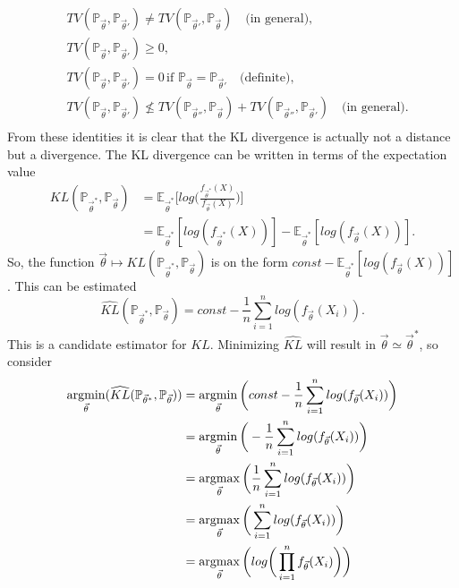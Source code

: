 \begin{equation}
	\begin{split}
		&TV(\mathbb{P}_{\vec{\theta}},\mathbb{P}_{\vec{\theta}'})\neq TV(\mathbb{P}_{\vec{\theta}'},\mathbb{P}_{\vec{\theta}})\quad \text{(in general)},\\
		&TV(\mathbb{P}_{\vec{\theta}},\mathbb{P}_{\vec{\theta}'})\geq 0,\\
		&TV(\mathbb{P}_{\vec{\theta}},\mathbb{P}_{\vec{\theta}'})=0\,\text{if } \mathbb{P}_{\vec{\theta}}=\mathbb{P}_{\vec{\theta}'}\quad \text{(definite)} ,\\
		&TV(\mathbb{P}_{\vec{\theta}},\mathbb{P}_{\vec{\theta}'})\nleq  TV(\mathbb{P}_{\vec{\theta}''},\mathbb{P}_{\vec{\theta}})+TV(\mathbb{P}_{\vec{\theta}''},\mathbb{P}_{\vec{\theta}'})\quad \text{(in general)}.\\
	\end{split}
\end{equation}
From these identities it is clear that the KL divergence is actually not a distance but a divergence. The KL divergence can be written in terms of the expectation value
\begin{equation}
	\begin{split}
		KL(\mathbb{P}_{\vec{\theta}^*},\mathbb{P}_{\vec{\theta}})&=\mathbb{E}_{\vec{\theta}^*}\bigg[log\bigg(\frac{f_{\vec{\theta}^*}(X)}{f_{\vec{\theta}}(X)}\bigg)\bigg]\\
		&=\mathbb{E}_{\vec{\theta}^*}[log(f_{\vec{\theta}^*}(X))]-\mathbb{E}_{\vec{\theta}^*}[log(f_{\vec{\theta}}(X))].
	\end{split}
\end{equation}
So, the function $\vec{\theta}\mapsto KL(\mathbb{P}_{\vec{\theta}^*},\mathbb{P}_{\vec{\theta}})$ is on the form $const-\mathbb{E}_{\vec{\theta}^*}[log(f_{\vec{\theta}}(X))]$. This can be estimated 
\begin{equation}
	\widehat{KL}(\mathbb{P}_{\vec{\theta}^*},\mathbb{P}_{\vec{\theta}})=const-\frac{1}{n}\sum_{i=1}^nlog(f_{\vec{\theta}}(X_i)).
\end{equation}
This is a candidate estimator for $KL$. Minimizing $\widehat{KL}$ will result in $\vec{\theta}\simeq \vec{\theta}^*$, so consider
\begin{equation}
	\begin{split}
		\operatorname*{argmin}_{\vec{\theta}}(\widehat{KL}(\mathbb{P}_{\vec{\theta}^*},\mathbb{P}_{\vec{\theta}}))&=\operatorname*{argmin}_{\vec{\theta}}\bigg(const-\frac{1}{n}\sum_{i=1}^nlog(f_{\vec{\theta}}(X_i))\bigg)\\
		&=\operatorname*{argmin}_{\vec{\theta}}\bigg(-\frac{1}{n}\sum_{i=1}^nlog(f_{\vec{\theta}}(X_i))\bigg)\\
		&=\operatorname*{argmax}_{\vec{\theta}}\bigg(\frac{1}{n}\sum_{i=1}^nlog(f_{\vec{\theta}}(X_i))\bigg)\\
		&=\operatorname*{argmax}_{\vec{\theta}}\bigg(\sum_{i=1}^nlog(f_{\vec{\theta}}(X_i))\bigg)\\
		&=\operatorname*{argmax}_{\vec{\theta}}\bigg(log\bigg(\prod_{i=1}^nf_{\vec{\theta}}(X_i)\bigg)\bigg)\\
	\end{split}
\end{equation}

